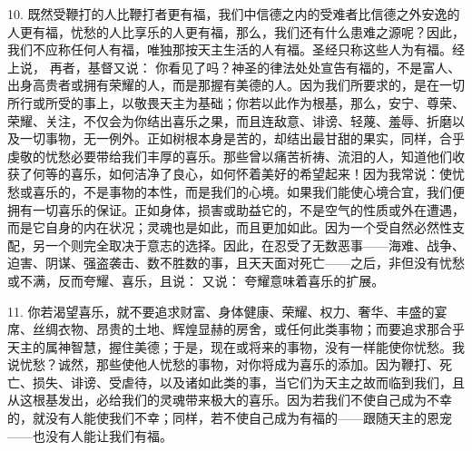 10. 既然受鞭打的人比鞭打者更有福，我们中信德之内的受难者比信德之外安逸的人更有福，忧愁的人比享乐的人更有福，那么，我们还有什么患难之源呢？因此，我们不应称任何人有福，唯独那按天主生活的人有福。圣经只称这些人为有福。经上说， 再者，基督又说：  你看见了吗？神圣的律法处处宣告有福的，不是富人、出身高贵者或拥有荣耀的人，而是那握有美德的人。因为我们所要求的，是在一切所行或所受的事上，以敬畏天主为基础；你若以此作为根基，那么，安宁、尊荣、荣耀、关注，不仅会为你结出喜乐之果，而且连敌意、诽谤、轻蔑、羞辱、折磨以及一切事物，无一例外。正如树根本身是苦的，却结出最甘甜的果实，同样，合乎虔敬的忧愁必要带给我们丰厚的喜乐。那些曾以痛苦祈祷、流泪的人，知道他们收获了何等的喜乐，如何洁净了良心，如何怀着美好的希望起来！因为我常说：使忧愁或喜乐的，不是事物的本性，而是我们的心境。如果我们能使心境合宜，我们便拥有一切喜乐的保证。正如身体，损害或助益它的，不是空气的性质或外在遭遇，而是它自身的内在状况；灵魂也是如此，而且更加如此。因为一个受自然必然性支配，另一个则完全取决于意志的选择。因此，在忍受了无数恶事——海难、战争、迫害、阴谋、强盗袭击、数不胜数的事，且天天面对死亡——之后，非但没有忧愁或不满，反而夸耀、喜乐，且说：  又说：  夸耀意味着喜乐的扩展。\par

11. 你若渴望喜乐，就不要追求财富、身体健康、荣耀、权力、奢华、丰盛的宴席、丝绸衣物、昂贵的土地、辉煌显赫的房舍，或任何此类事物；而要追求那合乎天主的属神智慧，握住美德；于是，现在或将来的事物，没有一样能使你忧愁。我说忧愁？诚然，那些使他人忧愁的事物，对你将成为喜乐的添加。因为鞭打、死亡、损失、诽谤、受虐待，以及诸如此类的事，当它们为天主之故而临到我们，且从这根基发出，必给我们的灵魂带来极大的喜乐。因为若我们不使自己成为不幸的，就没有人能使我们不幸；同样，若不使自己成为有福的——跟随天主的恩宠——也没有人能让我们有福。\par

